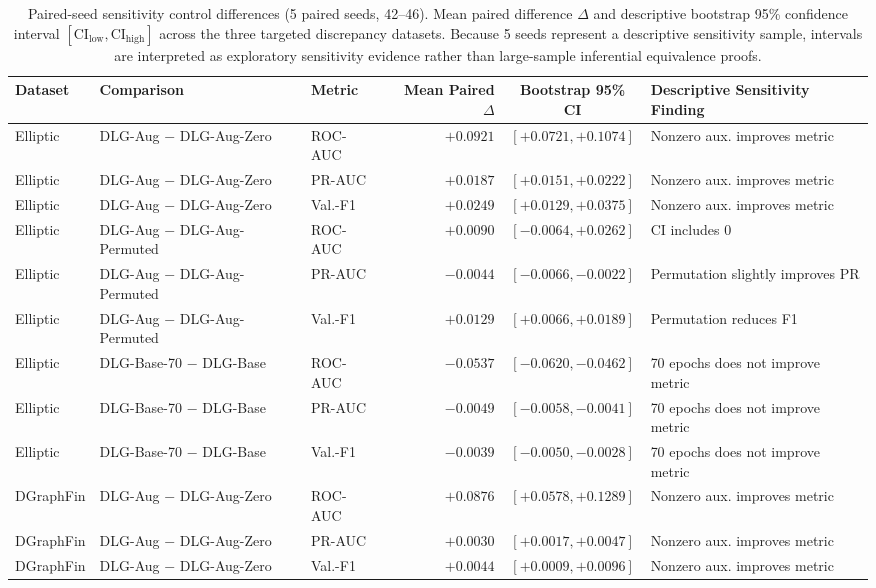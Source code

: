 \begin{table}[t]
\centering
\caption{Paired-seed sensitivity control differences (5 paired seeds, 42--46). Mean paired difference $\Delta$ and descriptive bootstrap 95\% confidence interval $[\mathrm{CI}_{\mathrm{low}}, \mathrm{CI}_{\mathrm{high}}]$ across the three targeted discrepancy datasets. Because 5 seeds represent a descriptive sensitivity sample, intervals are interpreted as exploratory sensitivity evidence rather than large-sample inferential equivalence proofs.}
\label{tab:capacity_controls_paired_deltas}
\scriptsize
\begin{tabular}{@{}l l l r c l@{}}
\toprule
\textbf{Dataset} & \textbf{Comparison} & \textbf{Metric} & \textbf{Mean Paired $\Delta$} & \textbf{Bootstrap 95\% CI} & \textbf{Descriptive Sensitivity Finding} \\
\midrule
Elliptic & DLG-Aug $-$ DLG-Aug-Zero & ROC-AUC & $+0.0921$ & $[+0.0721, +0.1074]$ & Nonzero aux. improves metric \\
Elliptic & DLG-Aug $-$ DLG-Aug-Zero & PR-AUC & $+0.0187$ & $[+0.0151, +0.0222]$ & Nonzero aux. improves metric \\
Elliptic & DLG-Aug $-$ DLG-Aug-Zero & Val.-F1 & $+0.0249$ & $[+0.0129, +0.0375]$ & Nonzero aux. improves metric \\
Elliptic & DLG-Aug $-$ DLG-Aug-Permuted & ROC-AUC & $+0.0090$ & $[-0.0064, +0.0262]$ & CI includes 0 \\
Elliptic & DLG-Aug $-$ DLG-Aug-Permuted & PR-AUC & $-0.0044$ & $[-0.0066, -0.0022]$ & Permutation slightly improves PR \\
Elliptic & DLG-Aug $-$ DLG-Aug-Permuted & Val.-F1 & $+0.0129$ & $[+0.0066, +0.0189]$ & Permutation reduces F1 \\
Elliptic & DLG-Base-70 $-$ DLG-Base & ROC-AUC & $-0.0537$ & $[-0.0620, -0.0462]$ & 70 epochs does not improve metric \\
Elliptic & DLG-Base-70 $-$ DLG-Base & PR-AUC & $-0.0049$ & $[-0.0058, -0.0041]$ & 70 epochs does not improve metric \\
Elliptic & DLG-Base-70 $-$ DLG-Base & Val.-F1 & $-0.0039$ & $[-0.0050, -0.0028]$ & 70 epochs does not improve metric \\
\midrule
DGraphFin & DLG-Aug $-$ DLG-Aug-Zero & ROC-AUC & $+0.0876$ & $[+0.0578, +0.1289]$ & Nonzero aux. improves metric \\
DGraphFin & DLG-Aug $-$ DLG-Aug-Zero & PR-AUC & $+0.0030$ & $[+0.0017, +0.0047]$ & Nonzero aux. improves metric \\
DGraphFin & DLG-Aug $-$ DLG-Aug-Zero & Val.-F1 & $+0.0044$ & $[+0.0009, +0.0096]$ & Nonzero aux. improves metric \\

\end{tabular}
\end{table}
